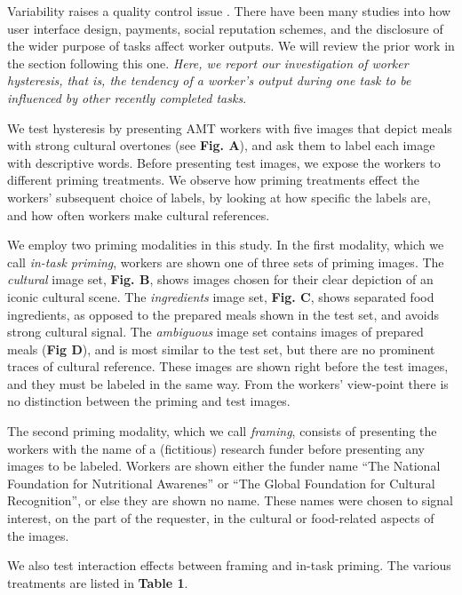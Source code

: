 \documentclass[a4paper]{report}
\begin{document}
Variability raises a quality control issue \cite{kazai2013analysis}. There 
have been many studies 
into how user interface design, payments, social reputation schemes, and the 
disclosure of the wider purpose of tasks affect worker outputs. We will 
review the prior work in the section following this one.
{\em Here, we report our investigation of worker {\em hysteresis}, that is, 
the tendency of a worker's output during one task to be influenced by other 
recently completed tasks}. 

We test hysteresis by presenting AMT workers with
five images that depict meals with strong cultural overtones 
(see \textbf{Fig. A}), and ask them to
label each image with descriptive words.  Before presenting test images,
we expose the workers to different priming treatments.  We observe how priming
treatments effect the workers' subsequent choice of labels, by looking at 
how specific the labels are, and how often workers make 
cultural references.

We employ two priming modalities in this study.  
In the first modality, which we call \textit{in-task priming}, workers are 
shown one of three sets of priming images.  The \textit{cultural}
image set, \textbf{Fig. B}, shows images chosen for their clear depiction of an
iconic cultural scene.  The \textit{ingredients} image set, \textbf{Fig. C}, 
shows separated food ingredients, as opposed to the prepared meals shown in 
the test set, and avoids strong cultural signal.  The \textit{ambiguous} 
image set contains images of prepared meals (\textbf{Fig D}), and is most 
similar to the test set, but there are no prominent traces of cultural 
reference.  These images are shown right
before the test images, and they must be labeled in the same way.  From the 
workers' view-point there is no distinction between the priming and test 
images. 

The second priming modality, which we call \textit{framing}, consists of
presenting the workers with the name of a (fictitious) research funder before
presenting any images to be labeled.  Workers are shown either the funder 
name  
``The National Foundation for Nutritional Awarenes'' or ``The Global
Foundation for Cultural Recognition'', or else they are shown no name.  These 
names were chosen to signal interest, on the part of the requester, in the
cultural or food-related aspects of the images.

We also test interaction effects between framing and in-task priming.  The
various treatments are listed in \textbf{Table 1}.
\end{document}
